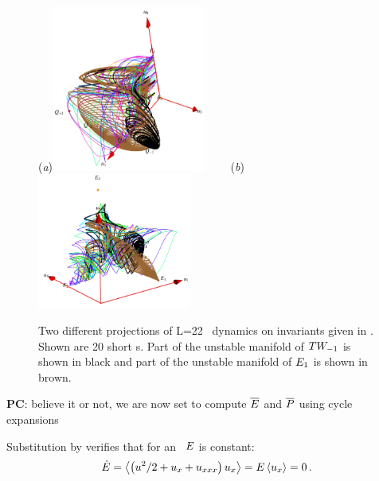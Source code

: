 \begin{figure}
\begin{center}
  (\textit{a})\includegraphics[width=0.45\textwidth, clip=true]{../figs/ksSO2inv134}
~~~~(\textit{b})\includegraphics[width=0.45\textwidth, clip=true]{../figs/ksSO2inv145}
\end{center}
\caption[\KS\  reduced \statesp\ projection II]
{Two different projections of L=22 \KS\ dynamics on
invariants given in . Shown are 20
short \rpo s. Part of the unstable manifold of $TW_{-1}$
is shown in black and part of the unstable manifold of
$E_{1}$ is shown in brown.}
\label{fig:SO2inv}
\end{figure}

{\bf PC}: believe it or not, we are now set to compute
    $\overline{E}$ and $\overline{P}$
    using cycle expansions


Substitution by 
verifies that for an \eqv\ $E$ is constant:
\[
   \dot{E} =
\left\langle { \left({u^2}/{2} + u_{x} + u_{xxx} \right) u_x} \right\rangle
    = E \left\langle { u_x } \right\rangle=0
    \,.
\]



